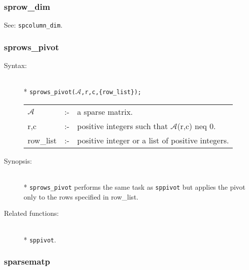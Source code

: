 \subsubsection{sprow\_dim}
\label{sparse:sprow_dim}

See: \texttt{spcolumn\_dim}.


\subsubsection{sprows\_pivot}
\label{sparse:sprows_pivot}

\begin{description}
\item[Syntax:]\mbox{}\\*
\texttt{sprows\_pivot($\mathcal{A}$,r,c,\{row\_list\});}\\[2mm]
\begin{tabular}{l l l} 
$\mathcal{A}$ &:-& a sparse matrix. \\
r,c        &:-& positive integers such that $\mathcal{A}$(r,c) neq 0.\\
row\_list  &:-& positive integer or a list of positive integers.
\end{tabular}

\item[Synopsis:]\mbox{}\\*
\texttt{sprows\_pivot} performs the same task as \texttt{sppivot} but applies 
the pivot only to the rows specified in row\_list.

\item[Related functions:]\mbox{}\\*
\texttt{sppivot}.
\end{description}

\subsubsection{sparsematp}
\label{sparse:sparsematp}

